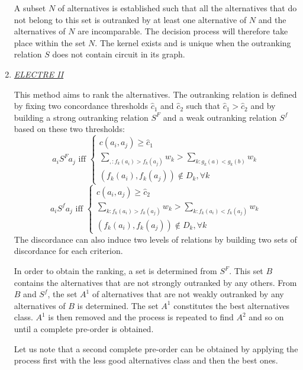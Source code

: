 \begin{enumerate}
A subset $N$ of alternatives is established such that all the alternatives that do not belong to this set is outranked by at least one alternative of $N$ and the alternatives of $N$ are incomparable. The decision process will therefore take place within the set $N$. The kernel exists and is unique when the outranking relation $S$ does not contain circuit in its graph.

\item \textit{\underline{ELECTRE II}}

This method aims to rank the alternatives. The outranking relation is defined by fixing two concordance thresholds $\hat{c}_{1}$ and $\hat{c}_{2}$ such that $\hat{c}_{1} > \hat{c}_{2}$ and by building a strong outranking relation $S^{F}$ and a weak outranking relation $S^{f}$ based on these two thresholds:
\begin{equation}
a_iS^{F}a_j \text{ iff } \begin{cases}
	c(a_i, a_j) \geq \hat{c}_{1}\\
	\sum_{, : f_{k}(a_i)>f_{k}(a_j)} w_{k} > \sum_{k : g_{k}(a)<g_{k}(b)} w_{k}\\
	(f_{k}(a_i), f_{k}(a_j)) \not\in D_{k}, \forall k
	\end{cases}
\end{equation}
\begin{equation}
a_iS^{f}a_j \text{ iff } \begin{cases}
	c(a_i, a_j) \geq \hat{c}_{2}\\
	\sum_{k : f_{k}(a_i)>f_{k}(a_j)} w_{k} > \sum_{k : f_{k}(a_i)<f_{k}(a_j)} w_{k}\\
	(f_{k}(a_i), f_{k}(a_j)) \not\in D_k, \forall k
	\end{cases}
\end{equation}
The discordance can also induce two levels of relations by building two sets of discordance for each criterion.

In order to obtain the ranking, a set is determined from $S^ {F}$. This set $B$ contains the alternatives that are not strongly outranked by any others. From $B$ and $S^{f}$, the set $A^{1}$ of alternatives that are not weakly outranked by any alternatives of $B$ is determined. The set $A^{1}$ constitutes the best alternatives class. $A^{1}$ is then removed and the process is repeated to find $A^{2}$ and so on until a complete pre-order is obtained.

Let us note that a second complete pre-order can be obtained by applying the process first with the less good alternatives class and then the best ones.


\end{enumerate}
